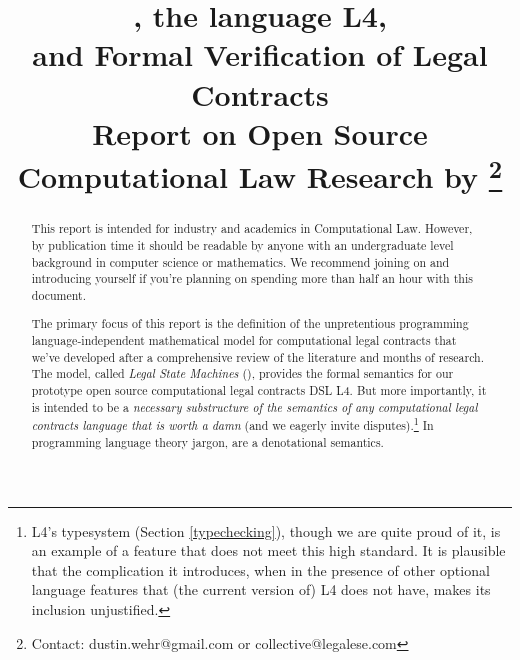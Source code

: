 \documentclass[12pt]{article}
\title{\lsmslong, the language L4,\\
and Formal Verification of Legal Contracts \\
\smaller \smaller Report on Open Source Computational Law Research by \extlink{https://legalese.com}{Legalese}\footnote{Contact: dustin.wehr@gmail.com or collective@legalese.com}\larger \larger }
\newcommand{\termz}[2]{\EM{\textsf{\hyperref[#1]{#2}}}\xspace}
\newcommand{\lsmslong}{Legal State Machines\xspace}
\newcommand{\lsms}{\texorpdfstring{\termz{lsm}{LSMs}}{LSMs}}
\begin{document}
\maketitle

\begin{abstract}
This report is intended for industry and academics in Computational Law. However, by publication time it should be readable by anyone with an undergraduate level background in computer science or mathematics. We recommend joining  on  and introducing yourself if you're planning on spending more than half an hour with this document. %

The primary focus of this report is the definition of the unpretentious programming language-independent mathematical model for computational legal contracts that we've developed after a comprehensive review of the literature and months of research. The model, called \textit{\lsmslong} (\lsms), provides the formal semantics for our prototype open source computational legal contracts DSL L4. But more importantly, it is intended to be a \textit{necessary substructure of the semantics of any computational legal contracts language that is worth a damn} (and we eagerly invite disputes).\footnote{L4's typesystem (Section \ref{typechecking}), though we are quite proud of it, is an example of a feature that does not meet this high standard. It is plausible that the complication it introduces, when in the presence of other optional language features that (the current version of) L4 does not have, makes its inclusion unjustified.}
In programming language theory jargon, \lsms are a denotational semantics.
\end{abstract}
\pagebreak

\tableofcontents
\end{document}
